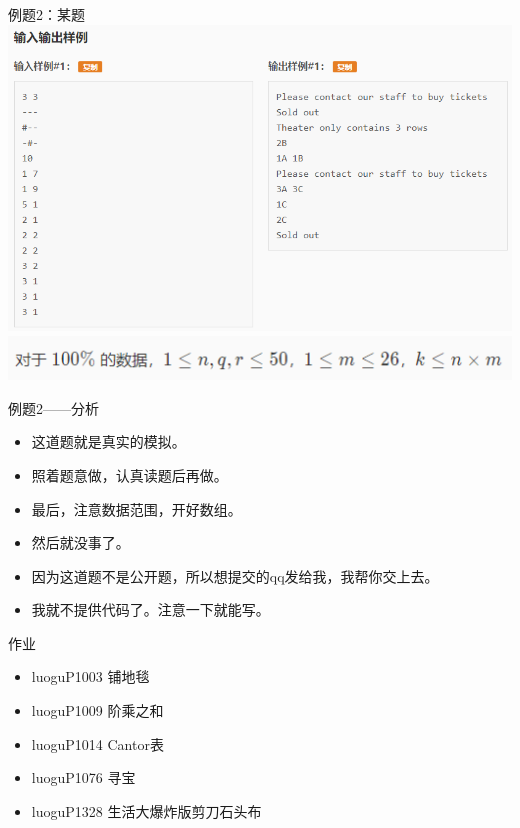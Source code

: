 \documentclass{beamer}[UTF-8]
\begin{document}
\begin{frame}{例题2：某题}
\includegraphics[width=\textwidth, height=\textheight]{temp2.png}
\includegraphics[width=\textwidth, height=\textheight]{temp3.png}
\end{frame}
\begin{frame}{例题2——分析}
 \pause
\begin{itemize}
\item 这道题就是真实的模拟。 \pause
\item 照着题意做，认真读题后再做。 \pause
\item 最后，注意数据范围，开好数组。 \pause
\item 然后就没事了。 \pause
\item 因为这道题不是公开题，所以想提交的qq发给我，我帮你交上去。
\item 我就不提供代码了。注意一下就能写。
\end{itemize}
\end{frame}

\begin{frame}{作业}
 \pause
\begin{itemize}
\item luoguP1003 铺地毯
\item luoguP1009 阶乘之和
\item luoguP1014 Cantor表
\item luoguP1076 寻宝
\item luoguP1328 生活大爆炸版剪刀石头布
\end{itemize}

\end{frame}
\end{document}
